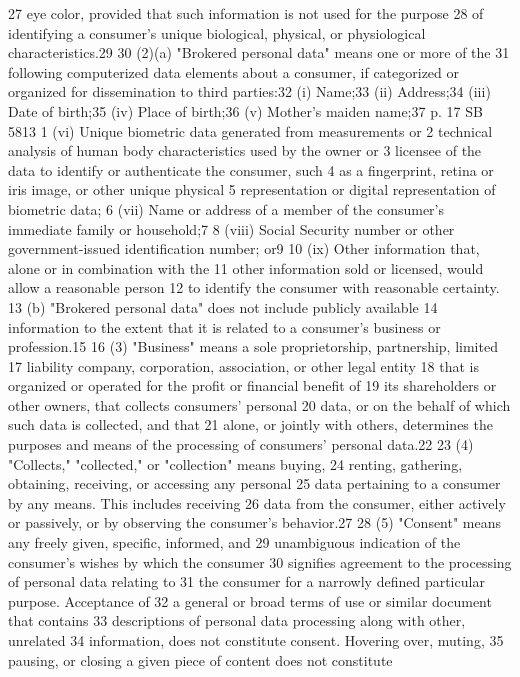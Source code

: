 27 eye color, provided that such information is not used for the purpose
28 of identifying a consumer's unique biological, physical, or
physiological characteristics.29
30 (2)(a) "Brokered personal data" means one or more of the
31 following computerized data elements about a consumer, if categorized
or organized for dissemination to third parties:32
(i) Name;33
(ii) Address;34
(iii) Date of birth;35
(iv) Place of birth;36
(v) Mother's maiden name;37
p. 17 SB 5813
1 (vi) Unique biometric data generated from measurements or
2 technical analysis of human body characteristics used by the owner or
3 licensee of the data to identify or authenticate the consumer, such
4 as a fingerprint, retina or iris image, or other unique physical
5 representation or digital representation of biometric data;
6 (vii) Name or address of a member of the consumer's immediate
family or household;7
8 (viii) Social Security number or other government-issued
identification number; or9
10 (ix) Other information that, alone or in combination with the
11 other information sold or licensed, would allow a reasonable person
12 to identify the consumer with reasonable certainty.
13 (b) "Brokered personal data" does not include publicly available
14 information to the extent that it is related to a consumer's business
or profession.15
16 (3) "Business" means a sole proprietorship, partnership, limited
17 liability company, corporation, association, or other legal entity
18 that is organized or operated for the profit or financial benefit of
19 its shareholders or other owners, that collects consumers' personal
20 data, or on the behalf of which such data is collected, and that
21 alone, or jointly with others, determines the purposes and means of
the processing of consumers' personal data.22
23 (4) "Collects," "collected," or "collection" means buying,
24 renting, gathering, obtaining, receiving, or accessing any personal
25 data pertaining to a consumer by any means. This includes receiving
26 data from the consumer, either actively or passively, or by observing
the consumer's behavior.27
28 (5) "Consent" means any freely given, specific, informed, and
29 unambiguous indication of the consumer's wishes by which the consumer
30 signifies agreement to the processing of personal data relating to
31 the consumer for a narrowly defined particular purpose. Acceptance of
32 a general or broad terms of use or similar document that contains
33 descriptions of personal data processing along with other, unrelated
34 information, does not constitute consent. Hovering over, muting,
35 pausing, or closing a given piece of content does not constitute
